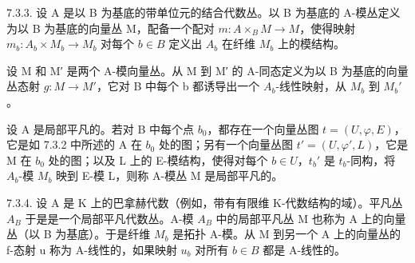 7.3.3. 设 A 是以 B 为基底的带单位元的结合代数丛。以 B 为基底的 A-模丛定义为以 B 为基底的向量丛 M，配备一个配对 \(m: A \times_{B} M \to M\)，使得映射 \(m_{b}: A_{b} \times M_{b} \to M_{b}\) 对每个 \(b \in B\) 定义出 \(A_{b}\) 在纤维 \(M_{b}\) 上的模结构。

设 M 和 M′ 是两个 A-模向量丛。从 M 到 M′ 的 A-同态定义为以 B 为基底的向量丛态射 \(g: M \rightarrow M'\)，它对 B 中每个 b 都诱导出一个 \(A_b\)-线性映射，从 \(M_b\) 到 \(M_b'\)。

设 A 是局部平凡的。若对 B 中每个点 \(b_0\)，都存在一个向量丛图 \(t = (U, \varphi, E)\)，它是如 7.3.2 中所述的 A 在 \(b_0\) 处的图；另有一个向量丛图 \(t' = (U, \varphi', L)\)，它是 M 在 \(b_0\) 处的图；以及 L 上的 E-模结构，使得对每个 \(b \in U\)，\(t_b'\) 是 \(t_b\)-同构，将 \(A_b\)-模 \(M_b\) 映到 E-模 L，则称 A-模丛 M 是局部平凡的。

7.3.4. 设 A 是 K 上的巴拿赫代数（例如，带有有限维 K-代数结构的域）。平凡丛 \(A_{B}\) 于是是一个局部平凡代数丛。A-模 \(A_{B}\) 中的局部平凡丛 M 也称为 A 上的向量丛（以 B 为基底）。于是纤维 \(M_{b}\) 是拓扑 A-模。从 M 到另一个 A 上的向量丛的 f-态射 u 称为 A-线性的，如果映射 \(u_{b}\) 对所有 \(b \in B\) 都是 A-线性的。

